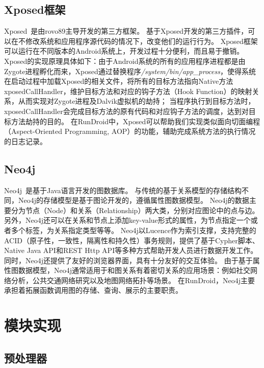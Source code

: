 
\subsection{Xposed框架}
Xposed~\cite{Xposed}是由rovo89主导开发的第三方框架。
基于Xposed开发的第三方插件，可以在不修改系统和应用程序源代码的情况下，改变他们的运行行为。
Xposed框架可以运行在不同版本的Android系统上，开发过程十分便利，而且易于撤销。
Xposed的实现原理具体如下：由于Android系统的所有的应用程序进程都是由Zygote进程孵化而来，Xposed通过替换程序\textit{/system/bin/app\_process}，使得系统在启动过程中加载Xposed的相关文件，将所有的目标方法指向Native方法xposedCallHandler，维护目标方法和对应的钩子方法（Hook Function）的映射关系，从而实现对Zygote进程及Dalvik虚拟机的劫持；
当程序执行到目标方法时，xposedCallHandler会完成目标方法的原有代码和对应钩子方法的调度，达到对目标方法劫持的目的。
在RunDroid中，Xposed可以帮助我们实现类似面向切面编程（Aspect-Oriented Programming, AOP）的功能，辅助完成系统方法的执行情况的日志记录。
\subsection{Neo4j}
Neo4j~\cite{Neo4jthe19}是基于Java语言开发的图数据库。
与传统的基于关系模型的存储结构不同，Neo4j的存储模型是基于图论开发的，遵循属性图数据模型。
Neo4j的数据主要分为节点（Node）和关系（Relationship）两大类，分别对应图论中的点与边。
另外，Neo4j还可以在关系和节点上添加key-value形式的属性，为节点指定一个或者多个标签，为关系指定类型等等。
Neo4j以Lucence作为索引支撑，支持完整的 ACID（原子性，一致性，隔离性和持久性）事务规则，提供了基于Cypher脚本、Native Java API和REST Http API等多种方式帮助开发人员进行数据开发工作。
同时，Neo4j还提供了友好的浏览器界面，具有十分友好的交互体验。
由于基于属性图数据模型，Neo4j通常适用于和图关系有着密切关系的应用场景：例如社交网络分析，公共交通网络研究以及地图网络拓扑等场景。
在RunDroid，Neo4j主要承担着拓展函数调用图的存储、查询、展示的主要职责。

\section{模块实现}


\subsection{预处理器}

